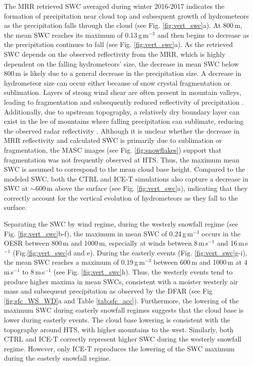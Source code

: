 \documentclass{ametsocV5}
\begin{document}
		The MRR retrieved SWC averaged during winter 2016-2017 indicates the formation of precipitation near cloud top and subsequent growth of hydrometeors as the precipitation falls through the cloud (see Fig. \ref{fig:vert_swc}a). At 800\,m, the mean SWC reaches its maximum of 0.13\,g\,m$^{-3}$ and then begins to decrease as the precipitation continues to fall (see Fig. \ref{fig:vert_swc}a). 
		As the retrieved SWC depends on the observed reflectivity from the MRR, which is highly dependent on the falling hydrometeors' size, the decrease in mean SWC below 800\,m is likely due to a general decrease in the precipitation size. A decrease in hydrometeor size can occur either because of snow crystal fragmentation or sublimation. 
		Layers of strong wind shear are often present in mountain valleys, leading to fragmentation and subsequently reduced reflectivity of precipitation \citep{ramelli_influence_2020}. Additionally, due to upstream topography, a relatively dry boundary layer can exist in the lee of mountains where falling precipitation can sublimate, reducing the observed radar reflectivity \citep[e.g.,][]{ramelli_microphysical_2020}. Although it is unclear whether the decrease in MRR reflectivity and calculated SWC is primarily due to sublimation or fragmentation, the MASC images (see Fig. \ref{fig:snowflakes}) support that fragmentation was not frequently observed at HTS. 
		Thus, the maximum mean SWC is assumed to correspond to the mean cloud base height. Compared to the modeled SWC, both the CTRL and ICE-T simulations also capture a decrease in SWC at $\sim$600\,m above the surface (see Fig. \ref{fig:vert_swc}a), indicating that they correctly account for the vertical evolution of hydrometeors as they fall to the surface.

		Separating the SWC by wind regime, during the westerly snowfall regime (see Fig. \ref{fig:vert_swc}b-f), the maximum in mean SWC of 0.24\,g\,m$^{-3}$ occurs in the OESR between 800\,m and 1000\,m, especially at winds between 8\,m\,s$^{-1}$ and 16\,m\,s$^{-1}$ (Fig.\ref{fig:vert_swc}d and e). During the easterly events (Fig. \ref{fig:vert_swc}g-i), the mean SWC reaches a maximum of 0.19\,g\,m$^{-3}$ between 600\,m and 1000\,m at 4\,m\,s$^{-1}$ to 8\,m\,s$^{-1}$ (see Fig. \ref{fig:vert_swc}h). Thus, the westerly events tend to produce higher maxima in mean SWCs, consistent with a moister westerly air mass and subsequent precipitation as observed by the DFAR (see Fig \ref{fig:sfc_WS_WD}a and Table \ref{tab:sfc_acc}). Furthermore, the lowering of the maximum SWC during easterly snowfall regimes suggests that the cloud base is lower during easterly events. The cloud base lowering is consistent with the topography around HTS, with higher mountains to the west. Similarly, both CTRL and ICE-T correctly represent higher SWC during the westerly snowfall regime. However, only ICE-T reproduces the lowering of the SWC maximum during the easterly snowfall regime. 
		
\end{document}
